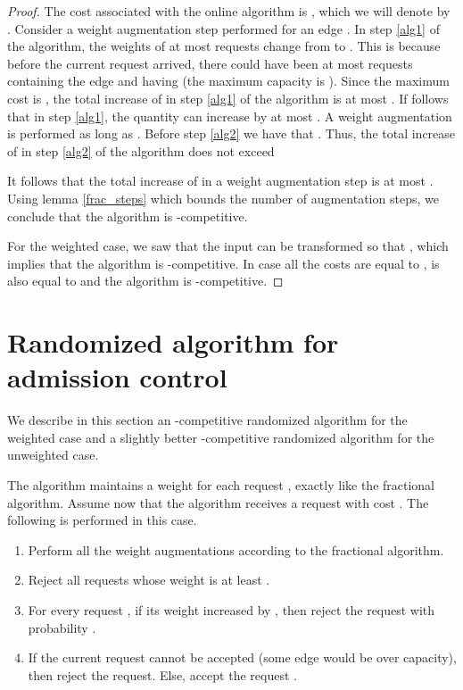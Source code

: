 \documentclass{sig-alternate}
\begin{document}
\begin{proof}
The cost associated with the online algorithm is , which we will denote by . Consider a
weight augmentation step performed for an edge . In step
\ref{alg1} of the algorithm, the weights of at most  requests
change from  to . This is because before the current
request arrived, there could have been at most  requests
containing the edge  and having  (the maximum capacity
is ). Since the maximum cost is , the total increase of
 in step \ref{alg1} of the algorithm is at most
. If follows that in step \ref{alg1},
the quantity  can increase by at most
. A weight augmentation is performed as long as . Before step \ref{alg2} we have that
. Thus, the total increase
of  in step \ref{alg2} of the algorithm does not exceed

It follows that the total increase of  in a weight
augmentation step is at most . Using lemma \ref{frac_steps}
which bounds the number of augmentation steps, we conclude that
the algorithm is -competitive.

For the weighted case, we saw that the input can be transformed so
that , which implies that the algorithm is -competitive. In case all the costs are equal to ,  is
also equal to  and the algorithm is -competitive.

\end{proof}

\section{Randomized algorithm for \\ admission control}\label{sec:rand}

We describe in this section an -competitive
randomized algorithm for the weighted case and a slightly better
-competitive randomized algorithm for the
unweighted case.

The algorithm maintains a weight  for each request ,
exactly like the fractional algorithm. Assume now that the
algorithm receives a request  with cost . The following
is performed in this case.
\begin{enumerate}
    \item Perform all the weight augmentations according to the fractional algorithm.
    \item Reject all requests whose weight is at least .\label{rand2}
    \item For every request , if its weight  increased by , then reject the request 
    with probability .\label{rand1}
    \item If the current request  cannot be accepted (some edge would be over capacity), then reject the
    request. Else, accept the request .\label{rand3}
\end{enumerate}
\end{document}
